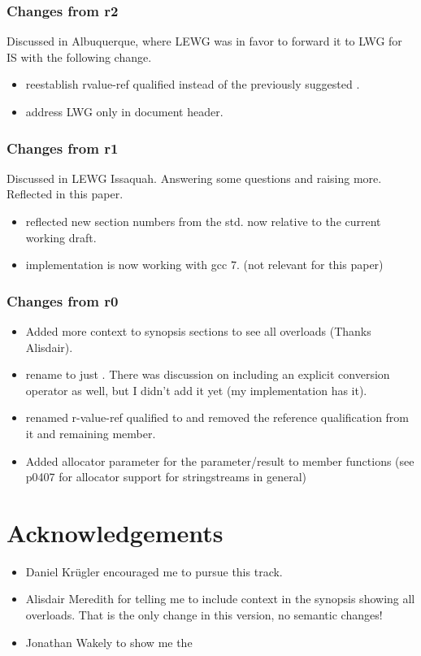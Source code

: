 \documentclass[ebook,11pt,article]{memoir}
\begin{document}
\subsection{Changes from r2}
Discussed in Albuquerque, where LEWG was in favor to forward it to LWG for IS with the following change.
\begin{itemize}
\item reestablish rvalue-ref qualified  instead of the previously suggested .
\item address LWG only in document header.
\end{itemize}


\subsection{Changes from r1}
Discussed in LEWG Issaquah. Answering some questions and raising more. Reflected in this paper.
\begin{itemize}
\item reflected new section numbers from the std. now relative to the current working draft.
\item implementation is now working with gcc 7. (not relevant for this paper)
\end{itemize}

\subsection{Changes from r0}
\begin{itemize}
\item Added more context to synopsis sections to see all overloads (Thanks Alisdair).
\item rename  to just . There was discussion on including an explicit conversion operator as well, but I didn't add it yet (my implementation has it).
\item renamed r-value-ref qualified  to  and removed the reference qualification from it and remaining  member.
\item Added allocator parameter for the  parameter/result to member functions (see p0407 for allocator support for stringstreams in general)
\end{itemize}


\chapter{Acknowledgements}
\begin{itemize}
\item Daniel Kr\"ugler encouraged me to pursue this track.
\item Alisdair Meredith for telling me to include context in the synopsis showing all overloads. That is the only change in this version, no semantic changes!
\item Jonathan Wakely to show me the 
\end{itemize}
\end{document}
